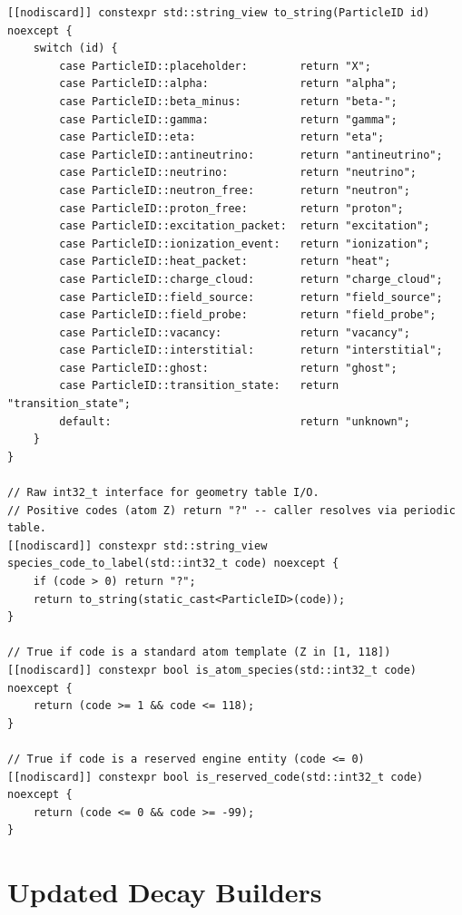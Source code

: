 \documentclass[11pt,a4paper]{article}
\begin{document}
\begin{lstlisting}[style=cpp20,
  caption={Geometry table label generation}]
[[nodiscard]] constexpr std::string_view to_string(ParticleID id) noexcept {
    switch (id) {
        case ParticleID::placeholder:        return "X";
        case ParticleID::alpha:              return "alpha";
        case ParticleID::beta_minus:         return "beta-";
        case ParticleID::gamma:              return "gamma";
        case ParticleID::eta:                return "eta";
        case ParticleID::antineutrino:       return "antineutrino";
        case ParticleID::neutrino:           return "neutrino";
        case ParticleID::neutron_free:       return "neutron";
        case ParticleID::proton_free:        return "proton";
        case ParticleID::excitation_packet:  return "excitation";
        case ParticleID::ionization_event:   return "ionization";
        case ParticleID::heat_packet:        return "heat";
        case ParticleID::charge_cloud:       return "charge_cloud";
        case ParticleID::field_source:       return "field_source";
        case ParticleID::field_probe:        return "field_probe";
        case ParticleID::vacancy:            return "vacancy";
        case ParticleID::interstitial:       return "interstitial";
        case ParticleID::ghost:              return "ghost";
        case ParticleID::transition_state:   return "transition_state";
        default:                             return "unknown";
    }
}

// Raw int32_t interface for geometry table I/O.
// Positive codes (atom Z) return "?" -- caller resolves via periodic table.
[[nodiscard]] constexpr std::string_view
species_code_to_label(std::int32_t code) noexcept {
    if (code > 0) return "?";
    return to_string(static_cast<ParticleID>(code));
}

// True if code is a standard atom template (Z in [1, 118])
[[nodiscard]] constexpr bool is_atom_species(std::int32_t code) noexcept {
    return (code >= 1 && code <= 118);
}

// True if code is a reserved engine entity (code <= 0)
[[nodiscard]] constexpr bool is_reserved_code(std::int32_t code) noexcept {
    return (code <= 0 && code >= -99);
}
\end{lstlisting}

\section{Updated Decay Builders}
\end{document}
